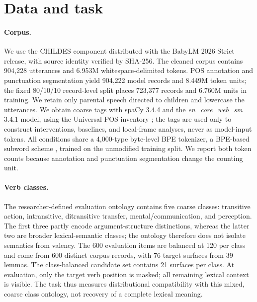 \documentclass[11pt]{article}
\begin{document}
\section{Data and task}

\paragraph{Corpus.}
We use the CHILDES component distributed with the BabyLM 2026 Strict release, with source identity verified by SHA-256. The cleaned corpus contains 904,228 utterances and 6.953M whitespace-delimited tokens. POS annotation and punctuation segmentation yield 904,222 model records and 8.449M token units; the fixed 80/10/10 record-level split places 723,377 records and 6.760M units in training. We retain only parental speech directed to children and lowercase the utterances. We obtain coarse tags with spaCy 3.4.4 and the \emph{en\_core\_web\_sm} 3.4.1 model, using the Universal POS inventory \citep{demarneffe2021}; the tags are used only to construct interventions, baselines, and local-frame analyses, never as model-input tokens. All conditions share a 4,000-type byte-level BPE tokenizer, a BPE-based subword scheme \citep{sennrich2016}, trained on the unmodified training split. We report both token counts because annotation and punctuation segmentation change the counting unit.

\paragraph{Verb classes.}
The researcher-defined evaluation ontology contains five coarse classes: transitive action, intransitive, ditransitive transfer, mental/communication, and perception. The first three partly encode argument-structure distinctions, whereas the latter two are broader lexical-semantic classes; the ontology therefore does not isolate semantics from valency. The 600 evaluation items are balanced at 120 per class and come from 600 distinct corpus records, with 76 target surfaces from 39 lemmas. The class-balanced candidate set contains 21 surfaces per class. At evaluation, only the target verb position is masked; all remaining lexical context is visible. The task thus measures distributional compatibility with this mixed, coarse class ontology, not recovery of a complete lexical meaning.
\end{document}
